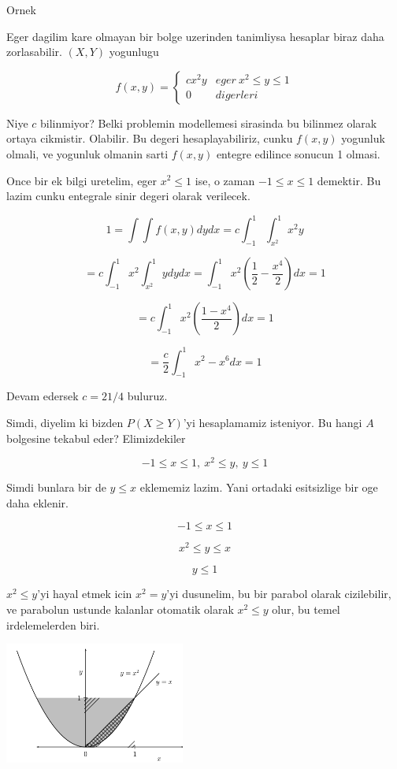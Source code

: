 \documentclass[12pt,fleqn]{article}\usepackage{../common}
\begin{document}
Ornek 

Eger dagilim kare olmayan bir bolge uzerinden tanimliysa hesaplar biraz
daha zorlasabilir. $(X,Y)$ yogunlugu 

\[ 
f(x,y) = 
\left\{ \begin{array}{ll}
cx^2y & eger \ x^2 \le y \le 1 \\
0 & digerleri
\end{array} \right.
 \]

Niye $c$ bilinmiyor? Belki problemin modellemesi sirasinda bu bilinmez
olarak ortaya cikmistir. Olabilir. Bu degeri hesaplayabiliriz, cunku
$f(x,y)$ yogunluk olmali, ve yogunluk olmanin sarti $f(x,y)$ entegre
edilince sonucun 1 olmasi. 

Once bir ek bilgi uretelim, eger $x^2 \le 1$ ise, o zaman $-1 \le x \le
1$ 
demektir. Bu lazim cunku entegrale sinir degeri olarak verilecek. 

\[ 1 = \int  \int f(x,y) dy dx = c \int _{ -1}^{1} \int _{ x^2}^{1}x^2y  \]

\[=  c \int _{ -1}^{1} x^2 \int _{ x^2}^{1} y dy dx = 
\int _{ -1}^{1} x^2 (\frac{ 1}{2} - \frac{ x^4}{2} )dx = 1
 \]

\[=  c \int _{ -1}^{1} x^2 (\frac{ 1 - x^4}{2} ) dx = 1 \]

\[ = \frac{ c}{2} \int _{ -1}^{1} x^2 - x^6 dx  = 1\]

Devam edersek $c = 21/4$ buluruz. 

Simdi, diyelim ki bizden $P(X \ge Y)$'yi hesaplamamiz isteniyor. Bu hangi
$A$ bolgesine tekabul eder? Elimizdekiler

\[ -1 \le x \le 1, \  x^2 \le y, \ y \le 1   \]

Simdi bunlara bir de $y \le x$ eklememiz lazim. Yani ortadaki esitsizlige
bir oge daha eklenir.

\[ -1 \le x \le 1 \]

\[  x^2 \le y \le x \]

\[  y \le 1   \]

$x^2 \le y$'yi hayal etmek icin $x^2 = y$'yi dusunelim, bu bir parabol
olarak cizilebilir, ve parabolun ustunde kalanlar otomatik olarak $x^2 \le
y$ 
olur, bu temel irdelemelerden biri. 


\includegraphics[height=4cm]{2_1.png}
\end{document}
